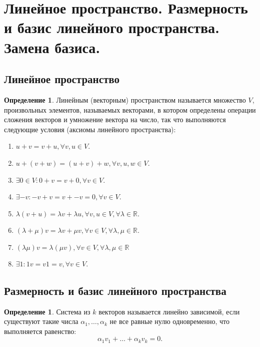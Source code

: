 \documentclass[12pt]{report}
\theoremstyle{definition}
\newtheorem{definition}[theorem]{Определение}
\newcommand{\R}{\mathbb R}
\begin{document}

\section
{
  Линейное пространство.
  Размерность и базис линейного пространства.
  Замена базиса.
}

\subsection{Линейное пространство}
\begin{definition}
Линейным (векторным) пространством называется множество $V$, произвольных элементов,
называемых векторами, в котором определены операции сложения векторов и умножение
вектора на число, так что выполняются следующие условия (аксиомы линейного пространства):

\begin{enumerate}
  \item $u + v = v + u, \forall v, u \in V$.
  \item $u + (v + w) = (u + v) + w, \forall v, u, w \in V$.
  \item $\exists 0 \in V: 0 + v = v + 0, \forall v \in V$.
  \item $\exists -v: -v + v = v + -v = 0, \forall v \in V$.
  \item $\lambda (v + u) = \lambda v + \lambda u, \forall v, u \in V, \forall \lambda \in \R$.
  \item $(\lambda + \mu) v = \lambda v + \mu v, \forall v \in V, \forall \lambda, \mu \in \R$.
  \item $(\lambda \mu) v = \lambda (\mu v), \forall v \in V, \forall \lambda, \mu \in \R$
  \item $\exists 1: 1 v = v 1 = v, \forall v \in V$.
\end{enumerate}
\end{definition}

\subsection{Размерность и базис линейного пространства}
\begin{definition}
Система из $k$ векторов называется линейно зависимой,
если существуют такие числа $\alpha_1, \dots, \alpha_k$ не все
равные нулю одновременно, что выполняется равенство:
$$
\alpha_1 v_1 + \dots + \alpha_k v_k = 0.
$$
\end{definition}
\end{document}
